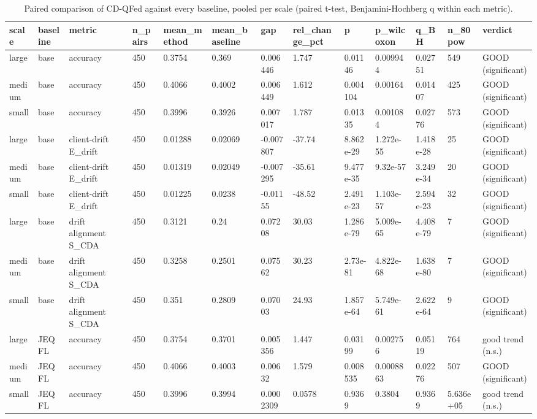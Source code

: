 \begin{table}[t]\centering\footnotesize
\caption{Paired comparison of CD-QFed against every baseline, pooled per scale (paired t-test, Benjamini-Hochberg q within each metric).}\label{tab:table5_paired_pooled}
\begin{tabular}{lllllllllllll}
\toprule
scale & baseline & metric & n\_pairs & mean\_method & mean\_baseline & gap & rel\_change\_pct & p & p\_wilcoxon & q\_BH & n\_80pow & verdict \\
\midrule
large & base & accuracy & 450 & 0.3754 & 0.369 & 0.006446 & 1.747 & 0.01146 & 0.009944 & 0.02751 & 549 & GOOD (significant) \\
medium & base & accuracy & 450 & 0.4066 & 0.4002 & 0.006449 & 1.612 & 0.004104 & 0.00164 & 0.01407 & 425 & GOOD (significant) \\
small & base & accuracy & 450 & 0.3996 & 0.3926 & 0.007017 & 1.787 & 0.01335 & 0.001084 & 0.02776 & 573 & GOOD (significant) \\
large & base & client-drift E\_drift & 450 & 0.01288 & 0.02069 & -0.007807 & -37.74 & 8.862e-29 & 1.272e-55 & 1.418e-28 & 25 & GOOD (significant) \\
medium & base & client-drift E\_drift & 450 & 0.01319 & 0.02049 & -0.007295 & -35.61 & 9.477e-35 & 9.32e-57 & 3.249e-34 & 20 & GOOD (significant) \\
small & base & client-drift E\_drift & 450 & 0.01225 & 0.0238 & -0.01155 & -48.52 & 2.491e-23 & 1.103e-57 & 2.594e-23 & 32 & GOOD (significant) \\
large & base & drift alignment S\_CDA & 450 & 0.3121 & 0.24 & 0.07208 & 30.03 & 1.286e-79 & 5.009e-65 & 4.408e-79 & 7 & GOOD (significant) \\
medium & base & drift alignment S\_CDA & 450 & 0.3258 & 0.2501 & 0.07562 & 30.23 & 2.73e-81 & 4.822e-68 & 1.638e-80 & 7 & GOOD (significant) \\
small & base & drift alignment S\_CDA & 450 & 0.351 & 0.2809 & 0.07003 & 24.93 & 1.857e-64 & 5.749e-61 & 2.622e-64 & 9 & GOOD (significant) \\
large & JEQFL & accuracy & 450 & 0.3754 & 0.3701 & 0.005356 & 1.447 & 0.03199 & 0.002756 & 0.05119 & 764 & good trend (n.s.) \\
medium & JEQFL & accuracy & 450 & 0.4066 & 0.4003 & 0.00632 & 1.579 & 0.008535 & 0.0008863 & 0.02276 & 507 & GOOD (significant) \\
small & JEQFL & accuracy & 450 & 0.3996 & 0.3994 & 0.0002309 & 0.0578 & 0.9369 & 0.3804 & 0.9369 & 5.636e+05 & good trend (n.s.) \\

\end{tabular}
\end{table}
